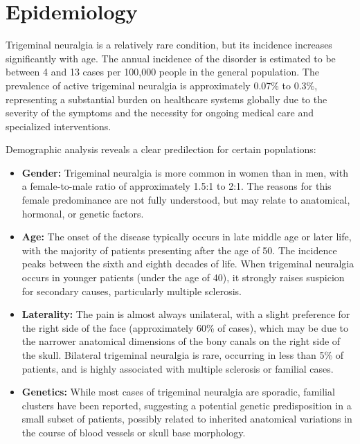 \section*{Epidemiology}
Trigeminal neuralgia is a relatively rare condition, but its incidence increases significantly with age. The annual incidence of the disorder is estimated to be between 4 and 13 cases per 100,000 people in the general population. The prevalence of active trigeminal neuralgia is approximately 0.07\% to 0.3\%, representing a substantial burden on healthcare systems globally due to the severity of the symptoms and the necessity for ongoing medical care and specialized interventions.

Demographic analysis reveals a clear predilection for certain populations:
\begin{itemize}
  \item \textbf{Gender:} Trigeminal neuralgia is more common in women than in men, with a female-to-male ratio of approximately 1.5:1 to 2:1. The reasons for this female predominance are not fully understood, but may relate to anatomical, hormonal, or genetic factors.
  \item \textbf{Age:} The onset of the disease typically occurs in late middle age or later life, with the majority of patients presenting after the age of 50. The incidence peaks between the sixth and eighth decades of life. When trigeminal neuralgia occurs in younger patients (under the age of 40), it strongly raises suspicion for secondary causes, particularly multiple sclerosis.
  \item \textbf{Laterality:} The pain is almost always unilateral, with a slight preference for the right side of the face (approximately 60\% of cases), which may be due to the narrower anatomical dimensions of the bony canals on the right side of the skull. Bilateral trigeminal neuralgia is rare, occurring in less than 5\% of patients, and is highly associated with multiple sclerosis or familial cases.
  \item \textbf{Genetics:} While most cases of trigeminal neuralgia are sporadic, familial clusters have been reported, suggesting a potential genetic predisposition in a small subset of patients, possibly related to inherited anatomical variations in the course of blood vessels or skull base morphology.
\end{itemize}

